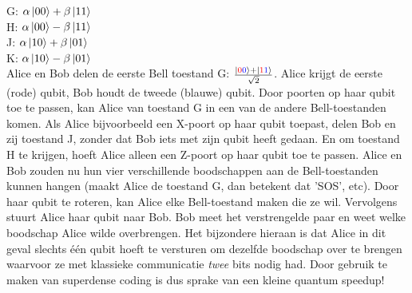 \documentclass[10pt, a4paper]{article}
\begin{document}
G: $\alpha\ket{00}+\beta\ket{11}$\\
H: $\alpha\ket{00}-\beta\ket{11}$\\
J: $\alpha\ket{10}+\beta\ket{01}$\\
K: $\alpha\ket{10}-\beta\ket{01}$\\

Alice en Bob delen de eerste Bell toestand G: $\frac{\ket{\textcolor{red}{0}\textcolor{blue}{0}}+\ket{\textcolor{red}{1}\textcolor{blue}{1}}}{\sqrt{2}}$. Alice krijgt de eerste (rode) qubit, Bob houdt de tweede (blauwe) qubit. Door poorten op haar qubit toe te passen, kan Alice van toestand G in een van de andere Bell-toestanden komen. Als Alice bijvoorbeeld een X-poort op haar qubit toepast, delen Bob en zij toestand J, zonder dat Bob iets met zijn qubit heeft gedaan. En om toestand H te krijgen, hoeft Alice alleen een Z-poort op haar qubit toe te passen. Alice en Bob zouden nu hun vier verschillende boodschappen aan de Bell-toestanden kunnen hangen (maakt Alice de toestand G, dan betekent dat 'SOS', etc). Door haar qubit te roteren, kan Alice elke Bell-toestand maken die ze wil. Vervolgens stuurt Alice haar qubit naar Bob. Bob meet het verstrengelde paar en weet welke boodschap Alice wilde overbrengen. Het bijzondere hieraan is dat Alice in dit geval slechts \'{e}\'{e}n qubit hoeft te versturen om dezelfde boodschap over te brengen waarvoor ze met klassieke communicatie \emph{twee} bits nodig had. Door gebruik te maken van superdense coding is dus sprake van een kleine quantum speedup!
\end{document}
